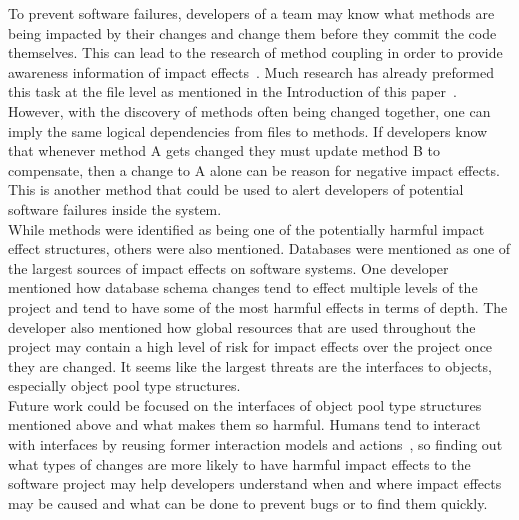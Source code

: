 \documentclass[conference]{IEEEtran}
\begin{document}
To prevent software failures, developers of a team may know what methods are being
impacted by their changes and change them before they commit the code themselves.
This can lead to the research of method coupling in order to provide awareness information
of impact effects~\cite{DAmbros:2006:ERV}. Much research has already preformed this task at the file level as mentioned
in the Introduction of this paper~\cite{Beyer:2005:CSA}. However, with the discovery of methods often being changed 
together, one can imply the same logical dependencies from files to methods. If developers
know that whenever method A gets changed they must update method B to compensate,
then a change to A alone can be reason for negative impact effects. This is another method
that could be used to alert developers of potential software failures inside the system.\\

While methods were identified as being one of the potentially harmful impact effect
structures, others were also mentioned. Databases were mentioned as one of the largest
sources of impact effects on software systems. One developer mentioned how database
schema changes tend to effect multiple levels of the project and tend to have some of
the most harmful effects in terms of depth. The developer also mentioned how global
resources that are used throughout the project may contain a high level of risk for impact
effects over the project once they are changed. It seems like the largest threats are
the interfaces to objects, especially object pool type structures.\\

Future work could be focused on the interfaces of object pool type structures mentioned
above and what makes them so harmful. Humans tend to interact with interfaces
by reusing former interaction models and actions~\cite{Besnard:2005:ICC},
so finding out what types of changes are more
likely to have harmful impact effects to the software project may help developers understand
when and where impact effects may be caused and what can be done to prevent bugs 
or to find them quickly.\\
\end{document}
